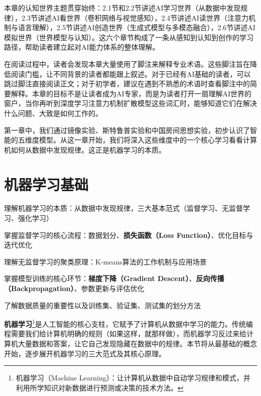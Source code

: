 本章的认知世界主题贯穿始终：2.1节和2.2节讲述AI学习世界（从数据中发现规律），2.3节讲述AI看世界（卷积网络与视觉感知），2.4节讲述AI读世界（注意力机制与语言理解），2.5节讲述AI创造世界（生成式模型与多模态融合），2.6节讲述AI模拟世界（世界模型与认知）。这六个章节构成了一条从感知到认知到创作的学习路径，帮助读者建立起对AI能力体系的整体理解。

在阅读过程中，读者会发现本章大量使用了脚注来解释专业术语。这些脚注旨在降低阅读门槛，让不同背景的读者都能跟上叙述。对于已经有AI基础的读者，可以跳过脚注直接阅读正文；对于初学者，建议在遇到不熟悉的术语时查看脚注中的简要解释。本章的目标不是让读者成为AI专家，而是为读者打开一扇理解AI世界的窗户，当你再听到深度学习注意力机制扩散模型这些词汇时，能够知道它们在解决什么问题、大致是如何工作的。

第一章中，我们通过镜像实验、斯特鲁普实验和中国房间思想实验，初步认识了智能的五维度模型。从这一章开始，我们将深入这些维度中的一个核心学习看看计算机如何从数据中发现规律。这正是机器学习的本质。

\newpage
\section{机器学习基础}


\begin{sectionkeypoints}
\item 理解机器学习的本质：从数据中发现规律，三大基本范式（监督学习、无监督学习、强化学习）
\item 掌握监督学习的核心流程：数据划分、\textbf{损失函数（Loss Function）}、优化目标与迭代优化
\item 理解无监督学习的聚类原理：K-means算法的工作机制与应用场景
\item 掌握模型训练的核心环节：\textbf{梯度下降（Gradient Descent）}、\textbf{反向传播（Backpropagation）}、参数更新与评估优化
\item 了解数据质量的重要性以及训练集、验证集、测试集的划分方法
\end{sectionkeypoints}




\textbf{机器学习}\footnote{机器学习（Machine Learning）：让计算机从数据中自动学习规律和模式，并利用所学知识对新数据进行预测或决策的技术方法。}是人工智能的核心支柱，它赋予了计算机从数据中学习的能力。传统编程需要我们给计算机明确的规则（如果这样，就那样做），而机器学习反过来给计算机大量数据和答案，让它自己发现隐藏在数据中的规律。本节将从最基础的概念开始，逐步展开机器学习的三大范式及其核心原理。

